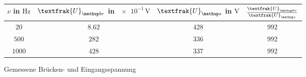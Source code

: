 \begin{figure}
\centering
\caption{Gemessene Brücken- und Eingangsspannung}
  \label{tab:U_br_u-s}
\begin{tabular}{S S S S}
    \toprule
    {$\nu$  in $\si{\hertz}$} &  {$\textfrak{U}\ua{br}$ in $\num{e-1}\,\si{\volt}$} & {$\textfrak{U}\ua{s}$  in $\si{\volt}$} & {$\frac{\textfrak{U}\ua{br}}{\textfrak{U}\ua{s}}$} \\
    \midrule
     {$\num{20}$} & {$\num{8.62}$} &  {$\num{428}$}& {$\num{992}$}  \\
     {$\num{500}$} & {$\num{282}$}  & {$\num{336}$} & {$\num{992}$} \\
     {$\num{1000}$} & {$\num{428}$}  & {$\num{337}$} & {$\num{992}$}  \\
    \bottomrule
  \end{tabular}
 \end{figure}